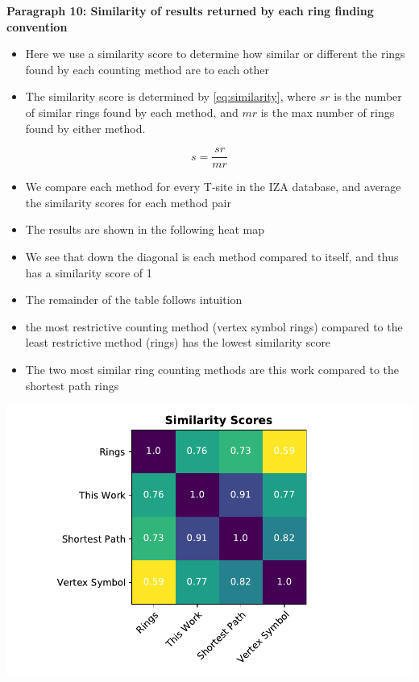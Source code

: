 \documentclass[11pt]{article}
\begin{document}
\textbf{\textbf{Paragraph 10: Similarity of results returned by each ring finding convention}}
\begin{itemize}
\item Here we use a similarity score to determine how similar or different the rings found by each counting method are to each other
\item The similarity score is determined by \cref{eq:similarity}, where \(sr\) is the number of similar rings found by each method, and \(mr\) is the max number of rings found by either method.
\end{itemize}
\begin{equation}\label{eq:similarity}
s = \frac{sr}{mr}
\end{equation}
\begin{itemize}
\item We compare each method for every T-site in the IZA database, and average the similarity scores for each method pair
\item The results are shown in the following heat map
\item We see that down the diagonal is each method compared to itself, and thus has a similarity score of 1
\item The remainder of the table follows intuition
\item the most restrictive counting method (vertex symbol rings) compared to the least restrictive method (rings) has the lowest similarity score
\item The two most similar ring counting methods are this work compared to the shortest path rings
\end{itemize}

\begin{center}
\includegraphics[width=.6\textwidth]{../figures/completed-figures/similarity-heat-map.pdf}
\end{center}
\end{document}
